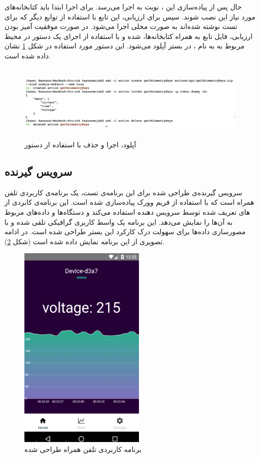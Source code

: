 حال پس از پیاده‌سازی این ، نوبت به اجرا می‌رسد. برای اجرا ابتدا باید کتابخانه‌های مورد نیاز این  نصب شوند. سپس برای ارزیابی، این تابع با استفاده از توابع دیگر که برای تست نوشته شده‌اند به صورت محلی اجرا می‌شود. در صورت موفقیت آمیز بودن ارزیابی، فایل تابع به همراه کتابخانه‌ها،  شده و با استفاده از اجرای یک دستور در محیط  مربوط به  به نام ، در بستر آپلود می‌شود. این دستور مورد استفاده در شکل \ref{wsk-cli} نشان داده شده است.

\begin{figure}[!h]
	\centering
	\includegraphics[height=3.7cm]{images/wsk-cli}
	\caption{آپلود، اجرا و حذف  با استفاده از دستور }
	\label{wsk-cli}
\end{figure}

\subsection{سرویس گیرنده}

سرویس گیرنده‌ی طراحی شده برای این برنامه‌ی تست، یک برنامه‌ی کاربردی تلفن همراه است که با استفاده از فریم وورک  پیاده‌سازی شده است. این برنامه‌ی کابردی از  های تعریف شده توسط سرویس دهنده استفاده می‌کند و دستگاه‌ها و داده‌های مربوط به آن‌ها را نمایش می‌دهد. این برنامه یک واسط کاربری گرافیکی تلقی شده و با مصورسازی داده‌ها برای سهولت درک کارکرد این بستر طراحی شده است. در ادامه تصویری از این برنامه نمایش داده شده است (شکل \ref{app}).

\begin{figure}[!h]
	\centering
	\includegraphics[height=10cm]{images/app}
	\caption{برنامه کاربردی تلفن همراه طراحی شده}
	\label{app}
\end{figure}

